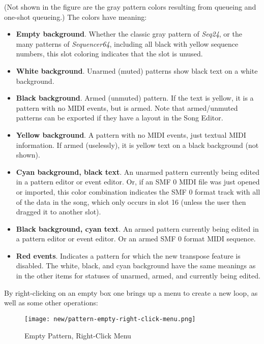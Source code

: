    (Not shown in the figure are the gray pattern
   colors resulting from queueing and one-shot queueing.)
   The colors have meaning:

   \begin{itemize}
      \item \textbf{Empty background}.  Whether the classic gray pattern
         of \textsl{Seq24}, or the many patterns of \textsl{Sequencer64},
         including all black with yellow sequence numbers, this
         slot coloring indicates that the slot is unused.
      \item \textbf{White background}.  Unarmed (muted) patterns show black
         text on a white background.
      \item \textbf{Black background}.  Armed (unmuted) pattern.  If the text
         is yellow, it is a pattern with no MIDI events, but is armed.  Note
         that armed/unmuted patterns can be exported if they have a layout in
         the Song Editor.
      \item \textbf{Yellow background}.  A pattern with no MIDI events, just
         textual MIDI information.  If armed (uselessly), it is yellow text on
         a black background (not shown).
      \item \textbf{Cyan background, black text}.
         An unarmed pattern currently being edited in a pattern editor or event
         editor. Or, if an SMF 0 MIDI file was just opened or imported, this
         color combination indicates the SMF 0 format track with all of the
         data in the song, which only occurs in slot 16 (unless the user then
         dragged it to another slot).
      \item \textbf{Black background, cyan text}.
         An armed pattern currently being edited in a pattern editor or event
         editor.  Or an armed SMF 0 format MIDI sequence.
      \item \textbf{Red events}.
         Indicates a pattern for which the new transpose feature is
         disabled.  The white, black, and cyan background have the same
         meanings as in the other items for statuses of unarmed, armed, and
         currently being edited.
   \end{itemize}

   By right-clicking on an empty box one brings up a menu to create
   a new loop, as well as some other operations:

\begin{figure}[H]
   \centering 
   \texttt{[image: new/pattern-empty-right-click-menu.png]}
   \caption{Empty Pattern, Right-Click Menu}
   \label{fig:pattern_window_empty_right_click}
\end{figure}

